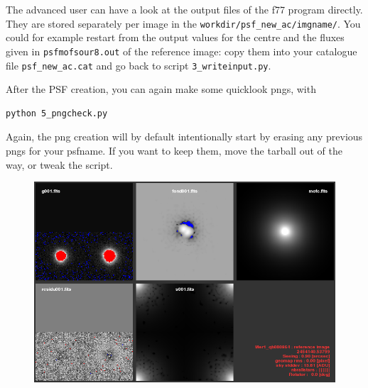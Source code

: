 The advanced user can have a look at the output files of the f77 program directly. They are stored separately per image in the \verb+workdir/psf_new_ac/imgname/+. You could for example restart from the output values for the centre and the fluxes given in \verb+psfmofsour8.out+ of the reference image: copy them into your catalogue file \verb+psf_new_ac.cat+ and go back to script \verb+3_writeinput.py+. 

After the PSF creation, you can again make some quicklook pngs, with 

\begin{Verbatim}
python 5_pngcheck.py
\end{Verbatim}
Again, the png creation will by default intentionally start by erasing any previous pngs for your psfname. If you want to keep them, move the tarball out of the way, or tweak the script.

\begin{figure}[htbp]
\begin{minipage}[c]{0.6\textwidth}
\includegraphics[width=1.0\textwidth]{images/psfpng.png}
\end{minipage} \hfill
\begin{minipage}[c]{.36\textwidth}
\caption{ \label{psfpng}}
\end{minipage}
\end{figure}

